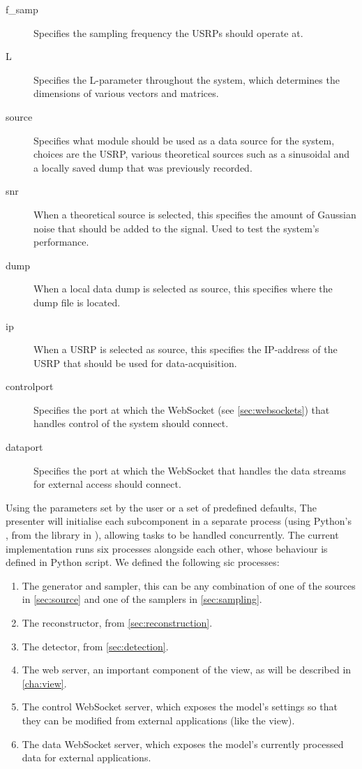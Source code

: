 \documentclass[a4paper, openany, oneside]{memoir}
\begin{document}
\begin{description}
	\item[f\_samp] Specifies the sampling frequency the USRPs should operate at.
	\item[L] Specifies the L-parameter throughout the system, which determines the dimensions of various vectors and matrices.
	\item[source] Specifies what module should be used as a data source for the system, choices are the USRP, various theoretical sources such as a sinusoidal and a locally saved dump that was previously recorded.
	\item[snr] When a theoretical source is selected, this specifies the amount of Gaussian noise that should be added to the signal. Used to test the system's performance.
	\item[dump] When a local data dump is selected as source, this specifies where the dump file is located.
	\item[ip] When a USRP is selected as source, this specifies the IP-address of the USRP that should be used for data-acquisition.
	\item[controlport] Specifies the port at which the WebSocket (see \cref{sec:websockets}) that handles control of the system should connect.
	\item[dataport] Specifies the port at which the WebSocket that handles the data streams for external access should connect.
\end{description}

Using the parameters set by the user or a set of predefined defaults, The presenter will initialise each subcomponent in a separate process (using Python's , from the  library in \cite{pythonref}), allowing tasks to be handled concurrently. The current implementation runs six processes alongside each other, whose behaviour is defined in  Python script. We defined the following sic processes:

\begin{enumerate}
	\item The generator and sampler, this can be any combination of one of the sources in \cref{sec:source} and one of the samplers in \cref{sec:sampling}.
	\item The reconstructor, from \cref{sec:reconstruction}.
	\item The detector, from \cref{sec:detection}.
	\item The web server, an important component of the view, as will be described in \cref{cha:view}.
	\item The control WebSocket server, which exposes the model's settings so that they can be modified from external applications (like the view).
	\item The data WebSocket server, which exposes the model's currently processed data for external applications.
\end{enumerate}
\end{document}
